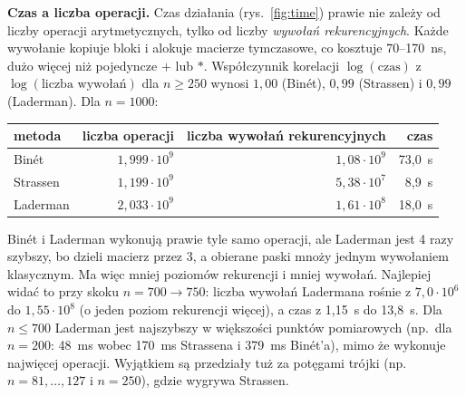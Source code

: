\documentclass[10pt,a4paper]{article}
\begin{document}
\textbf{Czas a liczba operacji.} Czas działania (rys.~\ref{fig:time}) prawie nie zależy od liczby operacji
arytmetycznych, tylko od liczby \emph{wywołań rekurencyjnych}. Każde wywołanie kopiuje bloki i alokuje macierze
tymczasowe, co kosztuje 70--170~ns, dużo więcej niż pojedyncze $+$ lub $*$. Współczynnik korelacji
$\log(\text{czas})$ z $\log(\text{liczba wywołań})$ dla $n\ge250$ wynosi $1{,}00$ (Binét), $0{,}99$ (Strassen)
i $0{,}99$ (Laderman). Dla $n=1000$:
\begin{center}
\begin{tabular}{lrrr}
\toprule
metoda & liczba operacji & liczba wywołań rekurencyjnych & czas \\
\midrule
Binét    & $1{,}999\cdot10^{9}$ & $1{,}08\cdot10^{9}$ & 73,0~s \\
Strassen & $1{,}199\cdot10^{9}$ & $5{,}38\cdot10^{7}$ & 8,9~s \\
Laderman & $2{,}033\cdot10^{9}$ & $1{,}61\cdot10^{8}$ & 18,0~s \\
\bottomrule
\end{tabular}
\end{center}
Binét i Laderman wykonują prawie tyle samo operacji, ale Laderman jest 4 razy szybszy, bo dzieli macierz przez 3,
a obierane paski mnoży jednym wywołaniem klasycznym. Ma więc mniej poziomów rekurencji i mniej wywołań.
Najlepiej widać to przy skoku $n=700\to750$: liczba wywołań Ladermana rośnie z $7{,}0\cdot10^{6}$ do
$1{,}55\cdot10^{8}$ (o jeden poziom rekurencji więcej), a czas z 1,15~s do 13,8~s. Dla $n\le700$ Laderman
jest najszybszy w większości punktów pomiarowych (np.\ dla $n=200$: 48~ms wobec 170~ms Strassena i 379~ms
Binét'a), mimo że wykonuje najwięcej operacji. Wyjątkiem są przedziały tuż za potęgami trójki
(np.\ $n=81,\dots,127$ i $n=250$), gdzie wygrywa Strassen.
\end{document}
